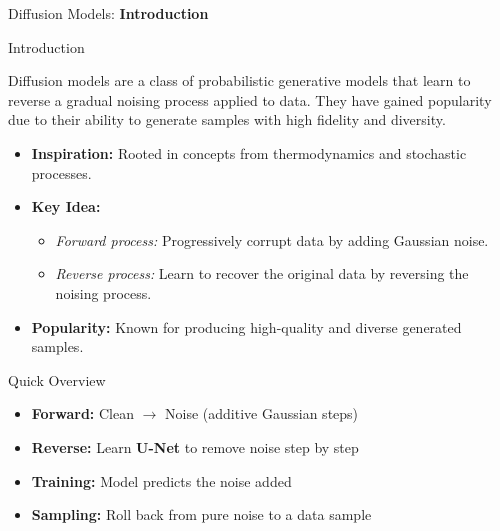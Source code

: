 \begin{frame}{}
    \LARGE Diffusion Models: \textbf{Introduction}
\end{frame}

\begin{frame}{Introduction}

Diffusion models are a class of probabilistic generative models that learn to reverse a gradual noising process applied to data. They have gained popularity due to their ability to generate samples with high fidelity and diversity.

\begin{itemize}
    \item<2-> \textbf{Inspiration:} Rooted in concepts from thermodynamics and stochastic processes.
    \item<3-> \textbf{Key Idea:} 
    \begin{itemize}
        \item \textit{Forward process:} Progressively corrupt data by adding Gaussian noise.
        \item \textit{Reverse process:} Learn to recover the original data by reversing the noising process.
    \end{itemize}
    \item<4-> \textbf{Popularity:} Known for producing high-quality and diverse generated samples.
\end{itemize}
\end{frame}

\begin{frame}{Quick Overview}
    \begin{itemize}
        \item \textbf{Forward:} Clean $\rightarrow$ Noise (additive Gaussian steps)
        \item \textbf{Reverse:} Learn \textbf{U-Net} to remove noise step by step
        \item \textbf{Training:} Model predicts the noise added
        \item \textbf{Sampling:} Roll back from pure noise to a data sample
    \end{itemize}
\end{frame}